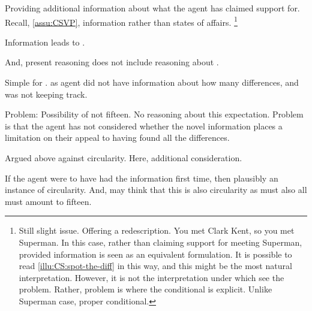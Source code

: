 \begin{note}
    Providing additional information about what the agent has claimed support for.
  Recall, \autoref{assu:CSVP}, information rather than states of affairs.
  \nolinebreak
  \footnote{
    Still slight issue.
    Offering a redescription.
    You met Clark Kent, so you met Superman.
    In this case, rather than claiming support for meeting Superman, provided information is seen as an equivalent formulation.
    It is possible to read \autoref{illu:CS:spot-the-diff} in this way, and this might be the most natural interpretation.
    However, it is not the interpretation under which see the problem.
    Rather, problem is where the conditional is explicit.
    Unlike Superman case, proper conditional.
  }
\end{note}

\begin{note}
  Information leads to \requ{}.

  And, present reasoning does not include reasoning about \requ{}.



  Simple for \requ{}.
  \expec{} as agent did not have information about how many differences, and was not keeping track.
\end{note}

\begin{note}
  Problem:
  Possibility of not fifteen.
  No reasoning about this expectation.
  Problem is that the agent has not considered whether the novel information places a limitation on their appeal to having found all the differences.
\end{note}

\begin{note}
  Argued above against circularity.
  Here, additional consideration.

  If the agent were to have had the information first time, then plausibly an instance of circularity.
  And, may think that this is also circularity as must also all must amount to fifteen.
\end{note}

